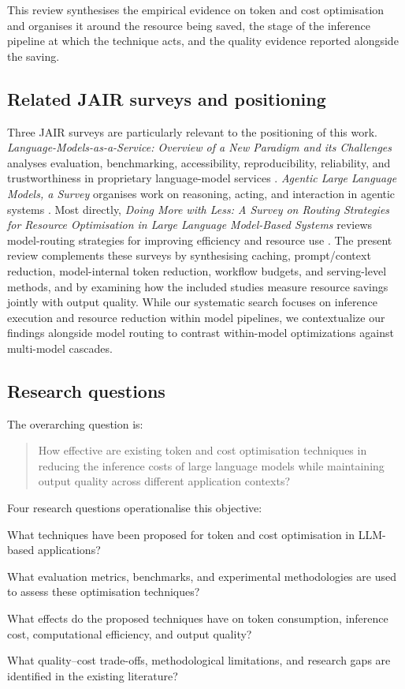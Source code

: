 \IfFileExists{jair.cls}{\documentclass{jair}}{\documentclass[manuscript,nonacm,screen]{acmart}}
\begin{document}
This review synthesises the empirical evidence on token and cost optimisation and organises it around the resource being saved, the stage of the inference pipeline at which the technique acts, and the quality evidence reported alongside the saving.

\subsection{Related JAIR surveys and positioning}

Three JAIR surveys are particularly relevant to the positioning of this work. \emph{Language-Models-as-a-Service: Overview of a New Paradigm and its Challenges} analyses evaluation, benchmarking, accessibility, reproducibility, reliability, and trustworthiness in proprietary language-model services \cite{JAIRLMaaS}. \emph{Agentic Large Language Models, a Survey} organises work on reasoning, acting, and interaction in agentic systems \cite{JAIRAgentic}. Most directly, \emph{Doing More with Less: A Survey on Routing Strategies for Resource Optimisation in Large Language Model-Based Systems} reviews model-routing strategies for improving efficiency and resource use \cite{JAIRRoutingSurvey}. The present review complements these surveys by synthesising caching, prompt/context reduction, model-internal token reduction, workflow budgets, and serving-level methods, and by examining how the included studies measure resource savings jointly with output quality. While our systematic search focuses on inference execution and resource reduction within model pipelines, we contextualize our findings alongside model routing to contrast within-model optimizations against multi-model cascades.

\subsection{Research questions}

The overarching question is:

\begin{quote}
How effective are existing token and cost optimisation techniques in reducing the inference costs of large language models while maintaining output quality across different application contexts?
\end{quote}

Four research questions operationalise this objective:

\begin{description}[leftmargin=1.3cm,style=nextline]
\item[RQ1] What techniques have been proposed for token and cost optimisation in LLM-based applications?
\item[RQ2] What evaluation metrics, benchmarks, and experimental methodologies are used to assess these optimisation techniques?
\item[RQ3] What effects do the proposed techniques have on token consumption, inference cost, computational efficiency, and output quality?
\item[RQ4] What quality--cost trade-offs, methodological limitations, and research gaps are identified in the existing literature?
\end{description}
\end{document}
